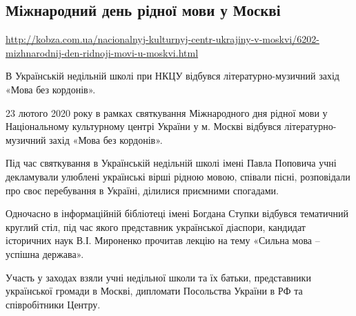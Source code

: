  


\subsection{Міжнародний день рідної мови у Москві}

{ \small
\vspace{0.5cm}
\url{http://kobza.com.ua/nacionalnyj-kulturnyj-centr-ukrajiny-v-moskvi/6202-mizhnarodnij-den-ridnoji-movi-u-moskvi.html}
\vspace{0.5cm}
}

В Українській недільній школі при НКЦУ відбувся літературно-музичний захід
«Мова без кордонів».

23 лютого 2020 року в рамках святкування Міжнародного дня рідної мови у
Національному культурному центрі України у м. Москві відбувся
літературно-музичний захід «Мова без кордонів».

Під час святкування в Українській недільній школі імені Павла Поповича учні
декламували улюблені українські вірші рідною мовою, співали пісні, розповідали
про своє перебування в Україні, ділилися приємними спогадами.

Одночасно в інформаційній бібліотеці імені Богдана Ступки відбувся тематичний
круглий стіл, під час якого представник української діаспори, кандидат
історичних наук В.І. Мироненко прочитав лекцію на тему «Сильна мова – успішна
держава».

Участь у заходах взяли учні недільної школи та їх батьки, представники
української громади в Москві, дипломати Посольства України в РФ  та
співробітники Центру.
